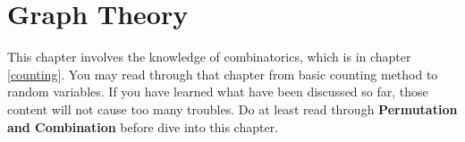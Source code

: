 \chapterspaceabove{6.75cm} 
\chapterspacebelow{7.25cm} 
\chapter{Graph Theory}
\begin{remark}
    This chapter involves the knowledge of combinatorics, which is in chapter \ref{counting}.
    You may read through that chapter from basic counting method to random variables.
    If you have learned what have been discussed so far, those content will not cause
    too many troubles. Do at least read through \textbf{Permutation and Combination}
    before dive into this chapter.
\end{remark}
